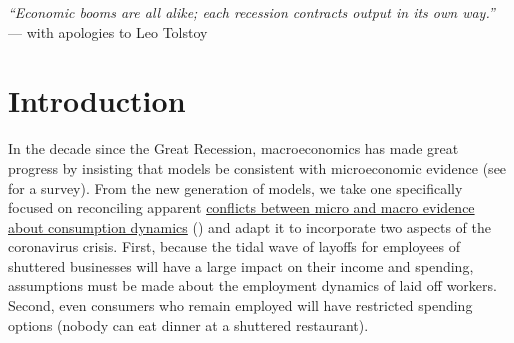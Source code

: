 \documentclass[titlepage]{\econtex}
\begin{document}
\setcounter{page}{1}


\titlepagefinish

\noindent \textit{``Economic booms are all alike; each recession contracts output in its own way.''} \\ \indent --- with apologies to Leo Tolstoy

\section{Introduction}


In the decade since the Great Recession, macroeconomics has made great progress by insisting that models be consistent with microeconomic evidence (see \cite{kmpHandbook} for a survey).  From the new generation of models, we take one specifically focused on reconciling apparent \href{https://doi.org/10.1016/j.euroecorev.2017.03.009}{conflicts between micro and macro evidence about consumption dynamics} (\cite{hrsHabit}) and adapt it to incorporate two aspects of the coronavirus crisis. First, because the tidal wave of layoffs for employees of shuttered businesses will have a large impact on their income and spending, assumptions must be made about the employment dynamics of laid off workers.  Second, even consumers who remain employed will have restricted spending options (nobody can eat dinner at a shuttered restaurant).
\end{document}
